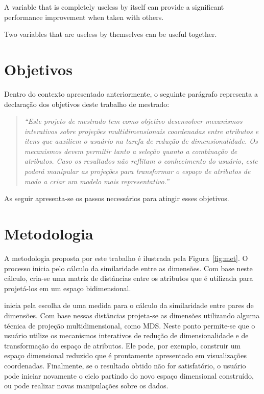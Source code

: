 A variable that is completely useless by itself can provide a significant performance improvement when taken with others.

Two variables that are useless by themselves can be useful together.

\section{Objetivos}



Dentro do contexto apresentado anteriormente, o seguinte parágrafo representa a declaração dos objetivos deste trabalho de mestrado:

\begin{quote}
    \emph{``Este projeto de mestrado tem como objetivo desenvolver mecanismos interativos sobre projeções multidimensionais coordenadas entre atributos e itens que auxiliem o usuário na tarefa de redução de dimensionalidade. Os mecanismos devem permitir tanto a seleção quanto a combinação de atributos. Caso os resultados não reflitam o conhecimento do usuário, este poderá manipular as projeções para transformar o espaço de atributos de modo a criar um modelo mais representativo.''}
\end{quote}

As seguir apresenta-se os passos necessários para atingir esses objetivos.

\section{Metodologia}

A metodologia proposta por este trabalho é ilustrada pela Figura~\ref{fig:met}. O processo inicia pelo cálculo da similaridade entre as dimensões. Com base neste cálculo, cria-se uma matriz de distâncias entre os atributos que é utilizada para projetá-los em um espaço bidimensional.   

inicia pela escolha de uma medida para o cálculo da similaridade entre pares de dimensões. Com base nessas distâncias projeta-se as dimensões utilizando alguma técnica de projeção multidimensional, como MDS. Neste ponto permite-se que o usuário utilize os mecanismos interativos de redução de dimensionalidade e de transformação do espaço de atributos. Ele pode, por exemplo, construir um espaço dimensional reduzido que é prontamente apresentado em visualizações coordenadas. Finalmente, se o resultado obtido não for satisfatório, o usuário pode iniciar novamente o ciclo partindo do novo espaço dimensional construído, ou pode realizar novas manipulações sobre os dados.

